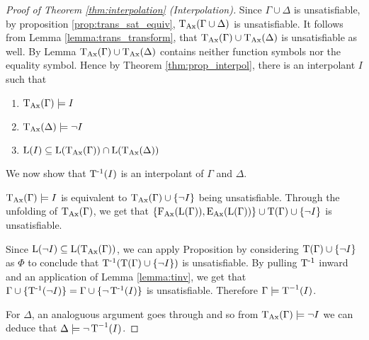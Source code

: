 \begin{proof}[Proof of Theorem \ref{thm:interpolation} (Interpolation)]
	Since $\Gamma \cup \Delta$ is unsatisfiable,
	by proposition \ref{prop:trans_sat_equiv}, $\operatorname{\operatorname{T}_{Ax}}(\Gamma \cup \Delta)$ is unsatisfiable.
	It follows from Lemma \ref{lemma:trans_transform}, that $\operatorname{\operatorname{T}_{Ax}}(\Gamma) \cup \operatorname{\operatorname{T}_{Ax}}(\Delta)$ is unsatisfiable as well.
	By Lemma  $\operatorname{\operatorname{T}_{Ax}}(\Gamma) \cup \operatorname{\operatorname{T}_{Ax}}(\Delta)$ contains neither function symbols nor the equality symbol.
	Hence by Theorem \ref{thm:prop_interpol}, there is an interpolant $I$ such that
	\begin{enumerate}
	\item $\operatorname{\operatorname{T}_{Ax}}(\Gamma) \models I$
	\item $\operatorname{\operatorname{T}_{Ax}}(\Delta) \models \lnot I$ 
	\item $\operatorname{L}(I) \subseteq \operatorname{L}(\operatorname{\operatorname{T}_{Ax}}(\Gamma)) \cap \operatorname{L}(\operatorname{\operatorname{T}_{Ax}}(\Delta))$
		\label{proof:interpolation1_3}
	\end{enumerate}

	We now show that $\operatorname{T^{-1}}(I)$ is an interpolant of $\Gamma$ and $\Delta$.

	$\operatorname{\operatorname{T}_{Ax}}(\Gamma) \models I$ is equivalent to $\operatorname{\operatorname{T}_{Ax}}(\Gamma) \cup \{\lnot I\}$ being unsatisfiable.
	Through the unfolding of $\operatorname{\operatorname{T}_{Ax}}(\Gamma)$, we get that 
	$\{\operatorname{F_{Ax}}(\operatorname{L}(\Gamma)), \operatorname{E_{Ax}}(\operatorname{L}(\Gamma))\} \cup \operatorname{T}(\Gamma) \cup \{\lnot I\}$ is unsatisfiable.

	Since $\operatorname{L}(\lnot I) \subseteq \operatorname{L}(\operatorname{\operatorname{T}_{Ax}}(\Gamma))$, we can apply Proposition
	 by considering $\operatorname{T}(\Gamma) \cup \{\lnot I\}$ as $\Phi$ to conclude that $\operatorname{T^{-1}}(\operatorname{T}(\Gamma) \cup \{\lnot I\})$ is unsatisfiable. By pulling $\operatorname{T^{-1}}$ inward and an application of Lemma \ref{lemma:tinv}, we get that $\Gamma \cup \{\operatorname{T^{-1}}(\lnot I)\} = \Gamma \cup \{\lnot \operatorname{T^{-1}}(I)\}$ is unsatisfiable. 
	Therefore $\Gamma \models \operatorname{T}^{-1}(I)$.

	For $\Delta$, an analoguous argument goes through and so from $\operatorname{\operatorname{T}_{Ax}}(\Gamma) \models \lnot I$ we can deduce that $\Delta \models \lnot \operatorname{T}^{-1}(I)$.


\end{proof}
